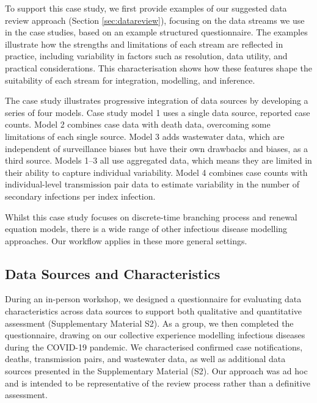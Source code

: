 \documentclass{article}
\begin{document}
To support this case study, we first provide examples of our suggested data review approach (Section \ref{sec:datareview}), focusing on the data streams we use in the case studies, based on an example structured questionnaire.
The examples illustrate how the strengths and limitations of each stream are reflected in practice, including variability in factors such as resolution, data utility, and practical considerations. This characterisation shows how these features shape the suitability of each stream for integration, modelling, and inference.

The case study illustrates progressive integration of data sources by developing a series of four models.
Case study model 1 uses a single data source, reported case counts.
Model 2 combines case data with death data, overcoming some limitations of each single source. Model 3 adds wastewater data, which are independent of surveillance biases but have their own drawbacks and biases, as a third source. Models 1--3 all use aggregated data, which means they are limited in their ability to capture individual variability. Model 4 combines case counts with individual-level transmission pair data to estimate variability in the number of secondary infections per index infection.

Whilst this case study focuses on discrete-time branching process and renewal equation models, there is a wide range of other infectious disease modelling approaches. Our workflow applies in these more general settings.

\subsection{Data Sources and Characteristics}

During an in-person workshop, we designed a questionnaire for evaluating data characteristics across data sources to support both qualitative and quantitative assessment (Supplementary Material S2).
As a group, we then completed the questionnaire, drawing on our collective experience modelling infectious diseases during the COVID-19 pandemic.
We characterised confirmed case notifications, deaths, transmission pairs, and wastewater data, as well as additional data sources presented in the Supplementary Material (S2). Our approach was ad hoc and is intended to be representative of the review process rather than a definitive assessment.
\end{document}
